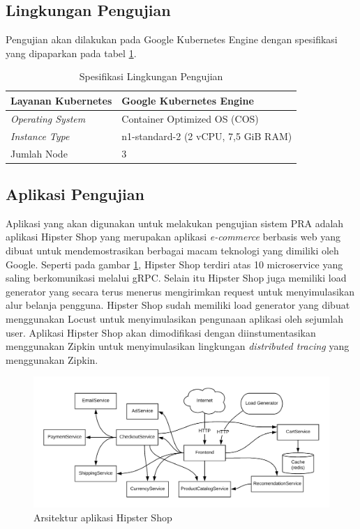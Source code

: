 \subsection{Lingkungan Pengujian}
Pengujian akan dilakukan pada Google Kubernetes Engine dengan spesifikasi yang dipaparkan pada tabel \ref{testing-env}.
\begin{small}
	\begin{longtable}{ | p{5cm} | p{8cm} | }
		\caption{Spesifikasi Lingkungan Pengujian}
		\label{testing-env}                                                           
		\\ \hline
		\centering\bfseries{Layanan Kubernetes} & \centering\bfseries{Google Kubernetes Engine} \tabularnewline \hline
		\endfirsthead
		\textit{Operating System} & Container Optimized OS (COS) \\ \hline
		\textit{Instance Type} & n1-standard-2 (2 vCPU,  7,5 GiB RAM) \\ \hline
		Jumlah Node & 3 \\ \hline
		
	\end{longtable}
\end{small}

\subsection{Aplikasi Pengujian}
Aplikasi yang akan digunakan untuk melakukan pengujian sistem PRA adalah aplikasi Hipster Shop yang merupakan aplikasi \textit{e-commerce} berbasis web yang dibuat untuk mendemostrasikan berbagai macam teknologi yang dimiliki oleh Google. Seperti pada gambar \ref{butiq-arch}, Hipster Shop terdiri atas 10 microservice yang saling berkomunikasi melalui gRPC. Selain itu Hipster Shop juga memiliki load generator yang secara terus menerus mengirimkan request untuk menyimulasikan alur belanja pengguna. Hipster Shop sudah memiliki load generator yang dibuat menggunakan Locust
untuk menyimulasikan pengunaan aplikasi oleh sejumlah user. Aplikasi Hipster Shop akan dimodifikasi dengan diinstumentasikan menggunakan Zipkin untuk menyimulasikan lingkungan \textit{distributed tracing} yang menggunakan Zipkin.

\begin{figure}[!htb]
	\centering
	\includegraphics[width=1\textwidth]{resources/ch4/hipster-arch.png}
	\caption{Arsitektur aplikasi Hipster Shop}
	\label{butiq-arch}
\end{figure}

